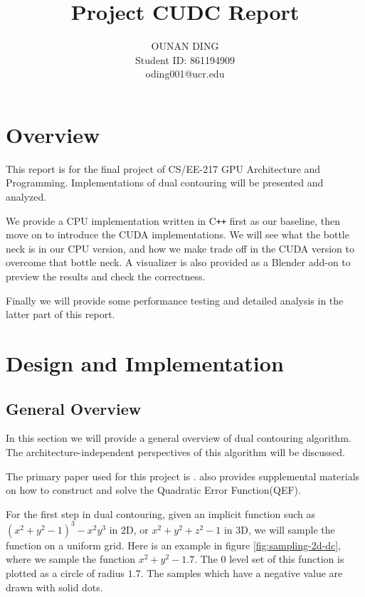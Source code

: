 \documentclass[a4paper,12pt]{article}
\title{Project CUDC Report}
\date{}
\author{
OUNAN DING\\
Student ID: 861194909\\
oding001@ucr.edu
}
\begin{document}
\maketitle{}

\tableofcontents{}

\section{Overview}

This report is for the final project of CS/EE-217 GPU Architecture
and Programming.
Implementations of dual contouring will be presented and analyzed.

We provide a CPU implementation written in C\texttt{++} first as our baseline,
then move on to introduce the CUDA implementations.
We will see what the bottle neck is in our CPU version,
and how we make trade off in the CUDA version to overcome that bottle neck.
A visualizer is also provided as a Blender add-on
to preview the results and check the correctness.

Finally we will provide some performance testing and detailed analysis
in the latter part of this report.

\section{Design and Implementation}

\subsection{General Overview}

In this section we will provide a general overview of dual contouring algorithm.
The architecture-independent perspectives
of this algorithm will be discussed.

The primary paper used for this project is \cite{ju2002dual}.
\cite{schaefer2002dual} also provides supplemental materials
on how to construct and solve the Quadratic Error Function(QEF).

For the first step in dual contouring, given an implicit function
such as $(x^2 + y^2 - 1)^3 - x^2y^3$ in 2D, or $x^2 + y^2 + z^2 - 1$ in 3D,
we will sample the function on a uniform grid.
Here is an example in figure \ref{fig:sampling-2d-dc},
where we sample the function $x^2 + y^2 - 1.7$.
The $0$ level set of this function is plotted as a circle of radius $1.7$.
The samples which have a negative value are drawn with solid dots.
\end{document}
